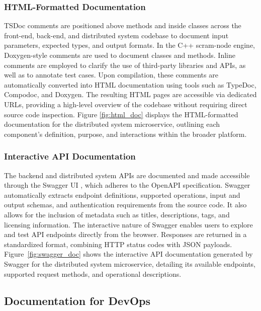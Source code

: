 \subsubsection{HTML-Formatted Documentation}

TSDoc comments are positioned above methods and inside classes across the front-end, back-end, and distributed system codebase to document input parameters, expected types, and output formats. In the C++ scram-node engine, Doxygen-style comments are used to document classes and methods. Inline comments are employed to clarify the use of third-party libraries and APIs, as well as to annotate test cases. Upon compilation, these comments are automatically converted into HTML documentation using tools such as TypeDoc, Compodoc, and Doxygen. The resulting HTML pages are accessible via dedicated URLs, providing a high-level overview of the codebase without requiring direct source code inspection. Figure \ref{fig:html_doc} displays the HTML-formatted documentation for the distributed system microservice, outlining each component’s definition, purpose, and interactions within the broader platform.



\subsubsection{Interactive API Documentation}

The backend and distributed system APIs are documented and made accessible through the Swagger UI \cite{What}, which adheres to the OpenAPI specification. Swagger automatically extracts endpoint definitions, supported operations, input and output schemas, and authentication requirements from the source code. It also allows for the inclusion of metadata such as titles, descriptions, tags, and licensing information. The interactive nature of Swagger enables users to explore and test API endpoints directly from the browser. Responses are returned in a standardized format, combining HTTP status codes with JSON payloads. Figure~\ref{fig:swagger_doc} shows the interactive API documentation generated by Swagger for the distributed system microservice, detailing its available endpoints, supported request methods, and operational descriptions.



\subsection{Documentation for DevOps}

